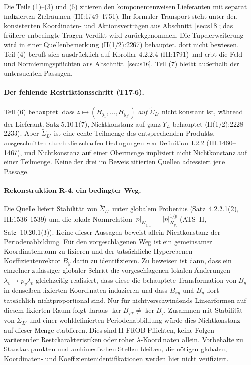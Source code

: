 \documentclass[11pt,a4paper]{article}
\theoremstyle{definition}
\theoremstyle{remark}
\begin{document}
Die Teile (1)--(3) und (5) zitieren den komponentenweisen Lieferanten
mit separat indizierten Zielräumen (III:1749--1751). Ihr formaler Transport
steht unter den konsistenten Koordinaten- und Aktionsverträgen aus
Abschnitt~\ref{sec:s18}; das frühere unbedingte Tragen-Verdikt wird
zurückgenommen. Die Tupelerweiterung wird in einer Quellenbemerkung
(II(1/2):2267) behauptet, dort nicht bewiesen. Teil (4) beruft sich
ausdrücklich auf Korollar 4.2.2.4 (III:1791) und erbt die Feld- und
Normierungspflichten aus Abschnitt~\ref{sec:s16}. Teil (7) bleibt außerhalb
der untersuchten Passagen.

\paragraph{Der fehlende Restriktionsschritt (T17-6).} Teil (6) behauptet,
dass $z \mapsto (H_{y_1},\dots,H_{y_{\ell^*}})$ \emph{auf}
$\widetilde{\Sigma}_{L'}$ nicht konstant ist, während der Lieferant, Satz
5.10.1(7), Nichtkonstanz auf ganz $Y_L$ behauptet (II(1/2):2228--2233). Aber
$\widetilde{\Sigma}_{L'}$ ist eine echte Teilmenge des entsprechenden
Produkts, ausgeschnitten durch die scharfen Bedingungen von Definition 4.2.2
(III:1460--1467), und Nichtkonstanz auf einer Obermenge impliziert nicht
Nichtkonstanz auf einer Teilmenge. Keine der drei im Beweis zitierten
Quellen adressiert jene Passage.

\paragraph{Rekonstruktion R-4: ein bedingter Weg.}
Die Quelle liefert Stabilität von $\widetilde\Sigma_{L'}$ unter globalem
Frobenius (Satz~4.2.2.1(2), III:1536--1539) und die lokale Normrelation
$|p|_{K_{y_{n-1}}}=|p|_{K_{y_n}}^{1/p}$ (ATS~II, Satz~10.20.1(3)).
Keine dieser Aussagen beweist allein Nichtkonstanz der Periodenabbildung.
Für den vorgeschlagenen Weg ist ein gemeinsamer Koordinatenraum zu
fixieren und der tatsächliche Hyperebenen-Koeffizientenvektor $B_y$
darin zu identifizieren. Zu beweisen ist dann, dass ein einzelner
zulässiger globaler Schritt die vorgeschlagenen lokalen Änderungen
$\lambda_v\mapsto p_v\lambda_v$ gleichzeitig realisiert, dass diese die
behauptete Transformation von $B_y$ in denselben fixierten Koordinaten
induzieren und dass $B_{\varphi y}$ und $B_y$ dort tatsächlich
nichtproportional sind. Nur für nichtverschwindende Linearformen auf
diesem fixierten Raum folgt daraus $\ker B_{\varphi y}\ne\ker B_y$.
Zusammen mit Stabilität von $\widetilde\Sigma_{L'}$ und einer
wohldefinierten Periodenabbildung würde dies Nichtkonstanz auf dieser
Menge etablieren. Dies sind H-FROB-Pflichten, keine Folgen variierender
Restcharakteristiken oder roher $\lambda$-Koordinaten allein. Vorbehalte
zu Standardpunkten und archimedischen Stellen bleiben; die nötigen
globalen, Koordinaten- und Koeffizientenidentifikationen werden hier
nicht verifiziert.
\end{document}
